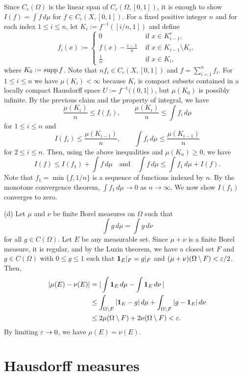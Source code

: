\documentclass{../../large}
\begin{document}
\begin{pf}
Since $C_c(\Omega)$ is the linear span of $C_c(\Omega,[0,1])$, it is enough to show $I(f)=\int f\,d\mu$ for $f\in C_c(X,[0,1])$.
For a fixed positive integer $n$ and for each index $1\le i\le n$, let $K_i:=f^{-1}([i/n,1])$ and define
\[f_i(x):=\begin{cases}0&\text{ if }x\in K_{i-1}^c,\\f(x)-\frac{i-1}n&\text{ if }x\in K_{i-1}\setminus K_i,\\\frac1n&\text{ if }x\in K_i,\end{cases}\]
where $K_0:=\operatorname{supp} f$.
Note that $nf_i\in C_c(X,[0,1])$ and $f=\sum_{i=1}^nf_i$.
For $1\le i\le n$ we have $\mu(K_i)<\infty$ because $K_i$ is compact subsets contained in a locally compact Hausdorff space $U:=f^{-1}((0,1])$, but $\mu(K_0)$ is possibly infinite.
By the previous claim and the property of integral, we have
\[\frac{\mu(K_i)}n\le I(f_i),\qquad\frac{\mu(K_i)}n\le\int f_i\,d\mu\]
for $1\le i\le n$ and
\[I(f_i)\le\frac{\mu(K_{i-1})}n,\qquad\int f_i\,d\mu\le\frac{\mu(K_{i-1})}n\]
for $2\le i\le n$.
Then, using the above inequalities and $\mu(K_n)\ge0$, we have
\[I(f)\le I(f_1)+\int f\,d\mu\quad\text{and}\quad\int f\,d\mu\le\int f_1\,d\mu+I(f).\]
Note that $f_1=\min\{f,1/n\}$ is a sequence of functions indexed by $n$.
By the monotone convergence theorem, $\int f_1\,d\mu\to0$ as $n\to\infty$.
We now show $I(f_1)$ converges to zero.

(d)
Let $\mu$ and $\nu$ be finite Borel measures on $\Omega$ such that
\[\int g\,d\mu=\int g\,d\nu\]
for all $g\in C(\Omega)$.
Let $E$ be any measurable set.
Since $\mu+\nu$ is a finite Borel measure, it is regular, and by the Luzin theorem, we have a closed set $F$ and $g\in C(\Omega)$ with $0\le g\le1$ such that $\mathbf{1}_E|_F=g|_F$ and $(\mu+\nu)(\Omega\setminus F)<\varepsilon/2$.
Then,
\begin{align*}
|\mu(E)-\nu(E)|&=|\int\mathbf{1}_E\,d\mu-\int\mathbf{1}_E\,d\nu\,|\\
&\le\int_{\Omega\setminus F}|\mathbf{1}_E-g|\,d\mu+\int_{\Omega\setminus F}|g-\mathbf{1}_E|\,d\nu\\
&\le2\mu(\Omega\setminus F)+2\nu(\Omega\setminus F)<\varepsilon.
\end{align*}
By limiting $\varepsilon\to0$, we have $\mu(E)=\nu(E)$.
\end{pf}


\begin{prb}
\end{prb}



\section{Hausdorff measures}
\end{document}
